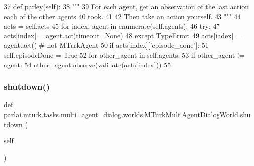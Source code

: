 \begin{DoxyCode}
37     \textcolor{keyword}{def }parley(self):
38         \textcolor{stringliteral}{"""}
39 \textcolor{stringliteral}{        For each agent, get an observation of the last action each of the other agents}
40 \textcolor{stringliteral}{        took.}
41 \textcolor{stringliteral}{}
42 \textcolor{stringliteral}{        Then take an action yourself.}
43 \textcolor{stringliteral}{        """}
44         acts = self.acts
45         \textcolor{keywordflow}{for} index, agent \textcolor{keywordflow}{in} enumerate(self.agents):
46             \textcolor{keywordflow}{try}:
47                 acts[index] = agent.act(timeout=\textcolor{keywordtype}{None})
48             \textcolor{keywordflow}{except} TypeError:
49                 acts[index] = agent.act()  \textcolor{comment}{# not MTurkAgent}
50             \textcolor{keywordflow}{if} acts[index][\textcolor{stringliteral}{'episode\_done'}]:
51                 self.episodeDone = \textcolor{keyword}{True}
52             \textcolor{keywordflow}{for} other\_agent \textcolor{keywordflow}{in} self.agents:
53                 \textcolor{keywordflow}{if} other\_agent != agent:
54                     other\_agent.observe(\hyperlink{namespaceparlai_1_1core_1_1worlds_afc3fad603b7bce41dbdc9cdc04a9c794}{validate}(acts[index]))
55 
\end{DoxyCode}
\mbox{\label{classparlai_1_1mturk_1_1tasks_1_1multi__agent__dialog_1_1worlds_1_1MTurkMultiAgentDialogWorld_a70cab1449b4b14d88003b075a1a9cd33}} 
\subsubsection{\texorpdfstring{shutdown()}{shutdown()}}
{\footnotesize\ttfamily def parlai.\+mturk.\+tasks.\+multi\+\_\+agent\+\_\+dialog.\+worlds.\+M\+Turk\+Multi\+Agent\+Dialog\+World.\+shutdown (\begin{DoxyParamCaption}\item[{}]{self }\end{DoxyParamCaption})}

